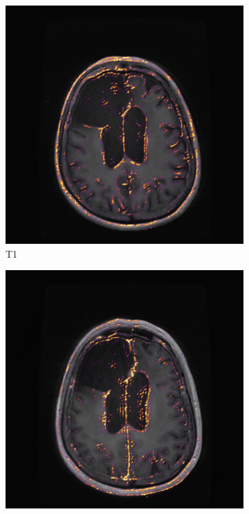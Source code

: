\begin{figure}[htbp]
    \centering

    \setlength{\figexamplewidth}{0.22\textwidth}

    \begin{subfigure}[t]{\figexamplewidth}
        \centering
        \includegraphics[trim={0.5cm 0cm 0.5cm 1cm}, clip,width=\textwidth]{Figures/T1_saliency}
        \caption{\gls{T1}}\label{fig:T1Cam}
    \end{subfigure}
    \begin{subfigure}[t]{\figexamplewidth}
        \centering
        \includegraphics[trim={0.5cm 0cm 0.5cm 1cm}, clip,width=\textwidth]{Figures/T1GD_saliency}

\end{subfigure}
\end{figure}

